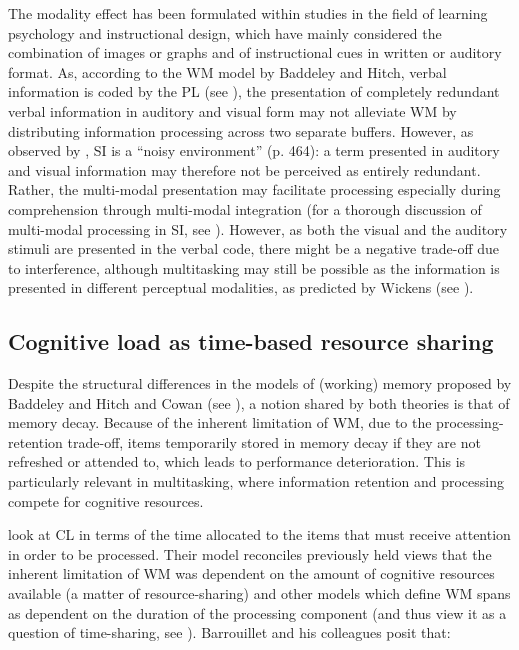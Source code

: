 The modality effect has been formulated within studies in the field of learning psychology and instructional design, which have mainly considered the combination of images or graphs and of instructional cues in written or auditory format. As, according to the WM model by Baddeley and Hitch, verbal information is coded by the PL (see ), the presentation of completely redundant verbal information in auditory and visual form may not alleviate WM by distributing information processing across two separate buffers. However, as observed by \citet{seeber_multimodal_2017}, SI is a ``noisy environment'' (p. 464): a term presented in auditory and visual information may therefore not be perceived as entirely redundant. Rather, the multi-modal presentation may facilitate processing especially during comprehension through multi-modal integration (for a thorough discussion of multi-modal processing in SI, see \citealt{seeber_multimodal_2017}). However, as both the visual and the auditory stimuli are presented in the verbal code, there might be a negative trade-off due to interference, although multitasking may still be possible as the information is presented in different perceptual modalities, as predicted by Wickens (see ).



\subsection{Cognitive load as time-based resource sharing} \label{barrouillet}
Despite the structural differences in the models of (working) memory proposed by Baddeley and Hitch and Cowan (see ), a notion shared by both theories is that of memory decay. Because of the inherent limitation of WM, due to the processing-retention trade-off, items temporarily stored in memory decay if they are not refreshed or attended to, which leads to performance deterioration. This is particularly relevant in multitasking, where information retention and processing compete for cognitive resources.

\citet{barrouillet_time_2004} look at CL in terms of the time allocated to the items that must receive attention in order to be processed. Their model reconciles previously held views that the inherent limitation of WM was dependent on the amount of cognitive resources available (a matter of resource-sharing) and other models which define WM spans as dependent on the duration of the processing component (and thus view it as a question of time-sharing, see \citealt{towse_is_1995}). Barrouillet and his colleagues posit that:

